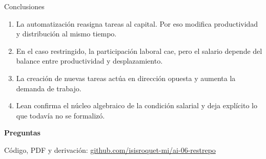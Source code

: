 \documentclass[aspectratio=169,11pt]{beamer}
\begin{document}
\begin{frame}{Conclusiones}
  \begin{enumerate}
    \item La automatización reasigna tareas al capital. Por eso modifica productividad y distribución al mismo tiempo.
    \item En el caso restringido, la participación laboral cae, pero el salario depende del balance entre productividad y desplazamiento.
    \item La creación de nuevas tareas actúa en dirección opuesta y aumenta la demanda de trabajo.
    \item Lean confirma el núcleo algebraico de la condición salarial y deja explícito lo que todavía no se formalizó.
  \end{enumerate}
  \vspace{0.6cm}
  \centering
  {\Large\color{navy}\textbf{Preguntas}}
  \vspace{0.45cm}

  {\small Código, PDF y derivación: \href{https://github.com/isisroquet-mi/ai-06-restrepo}{github.com/isisroquet-mi/ai-06-restrepo}}
\end{frame}
\end{document}
